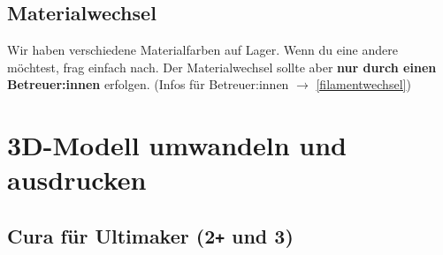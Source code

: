 \documentclass{\basedir/fablab-document}
\begin{document}
\subsection{Materialwechsel}
Wir haben verschiedene Materialfarben auf Lager. Wenn du eine andere möchtest, frag einfach nach.
Der Materialwechsel sollte aber \textbf{nur durch einen Betreuer:innen} erfolgen. (Infos für Betreuer:innen $\to$ \ref{filamentwechsel})


\section{3D-Modell umwandeln und ausdrucken}

\subsection{Cura für Ultimaker (2\texttt{+} und 3)}
\end{document}
